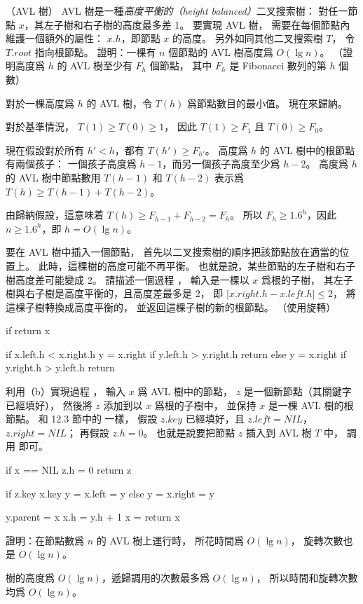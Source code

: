 
\startPROBLEM
（AVL 樹）
 AVL 樹是一種\emph{高度平衡的（height balanced）}二叉搜索樹：
對任一節點 $x$，其左子樹和右子樹的高度最多差 1。
要實現 AVL 樹，
需要在每個節點內維護一個額外的屬性： $x.h$，即節點 $x$ 的高度。
另外如同其他二叉搜索樹 $T$，
令 $T.root$ 指向根節點。
\startigBase[a]\startitem%
證明：一棵有 $n$ 個節點的 AVL 樹高度爲 $O(\lg n)$。
（\hint 證明高度爲 $h$ 的 AVL 樹至少有 $F_h$ 個節點，
其中 $F_h$ 是 Fibonacci 數列的第 $h$ 個數）
\stopitem\stopigBase

\startANSWER
對於一棵高度爲 $h$ 的 AVL 樹，令 $T(h)$ 爲節點數目的最小值。
現在來歸納。

對於基準情況， $T(1)\ge T(0)\ge 1$，
因此 $T(1)\ge F_1$ 且 $T(0)\ge F_0$。

現在假設對於所有 $h'<h$，都有 $T(h')\ge F_{h'}$。
高度爲 $h$ 的 AVL 樹中的根節點有兩個孩子：
一個孩子高度爲 $h-1$，而另一個孩子高度至少爲 $h-2$。
高度爲 $h$ 的 AVL 樹中節點數用 $T(h-1)$ 和 $T(h-2)$ 表示爲 $T(h)\ge T(h-1)+T(h-2)$。

由歸納假設，這意味着 $T(h)\ge F_{h-1} + F_{h-2} = F_h$。
所以 $F_h\ge 1.6^h$，因此 $n\ge 1.6^h$，即 $h=O(\lg n)$。
\stopANSWER

\startigBase[continue]\startitem%
要在 AVL 樹中插入一個節點，
首先以二叉搜索樹的順序把該節點放在適當的位置上。
此時，這棵樹的高度可能不再平衡。
也就是說，某些節點的左子樹和右子樹高度差可能變成 2。
請描述一個過程 ，
輸入是一棵以 $x$ 爲根的子樹，
其左子樹與右子樹是高度平衡的，且高度差最多是 2，
即 $|x.right.h - x.left.h|\le 2$，
將這棵子樹轉換成高度平衡的，
並返回這棵子樹的新的根節點。
（\hint 使用旋轉）
\stopitem\stopigBase

\startANSWER
{}
\startCLRSCODE
if  
	return x

if x.left.h < x.right.h
	y = x.right
	if y.left.h > y.right.h
	return 
else
	y = x.right
	if y.right.h > y.left.h
	return 
\stopCLRSCODE
\stopANSWER

\startigBase[continue]\startitem%
利用（b）實現過程 ，
輸入 $x$ 爲 AVL 樹中的節點， $z$ 是一個新節點（其關鍵字已經填好），
然後將 $z$ 添加到以 $x$ 爲根的子樹中，
並保持 $x$ 是一棵 AVL 樹的根節點。
和 12.3 節中的  一樣，
假設 $z.key$ 已經填好，且 $z.left=NIL$， $z.right=NIL$；
再假設 $z.h=0$。
也就是說要把節點 $z$ 插入到 AVL 樹 $T$ 中，
調用  即可。
\stopitem\stopigBase

\startANSWER
{}
\startCLRSCODE
if x == NIL
	z.h = 0
	return z

if z.key \le x.key
	y = 
	x.left = y
else
	y = 
	x.right = y

y.parent = x
x.h = y.h + 1
x = 
return x
\stopCLRSCODE
\stopANSWER

\startigBase[continue]\startitem%
證明：在節點數爲 $n$ 的 AVL 樹上運行時，
  所花時間爲 $O(\lg n)$，
旋轉次數也是 $O(\lg n)$。
\stopitem\stopigBase

\startANSWER
樹的高度爲 $O(\lg n)$，遞歸調用的次數最多爲 $O(\lg n)$，
所以時間和旋轉次數均爲 $O(\lg n)$。
\stopANSWER

\stopPROBLEM
